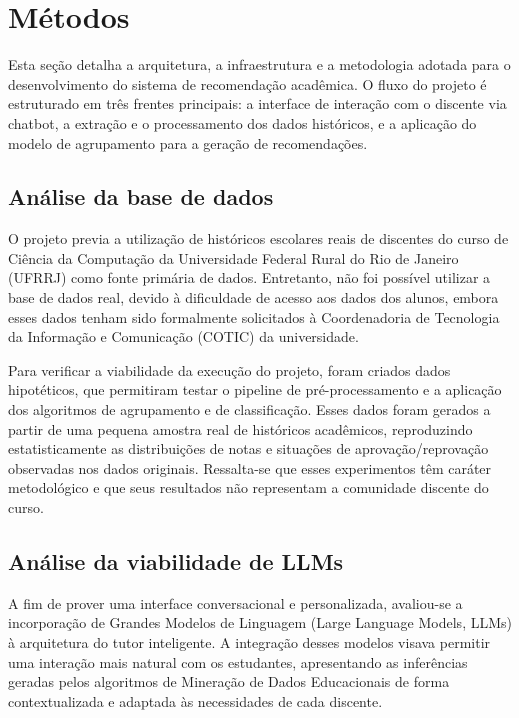 \section{Métodos}

Esta seção detalha a arquitetura, a infraestrutura e a metodologia adotada para o desenvolvimento do sistema de recomendação acadêmica. O fluxo do projeto é estruturado em três frentes principais: a interface de interação com o discente via chatbot, a extração e o processamento dos dados históricos, e a aplicação do modelo de agrupamento para a geração de recomendações.

\subsection{Análise da base de dados}

O projeto previa a utilização de históricos escolares reais de discentes do curso de Ciência da Computação da Universidade Federal Rural do Rio de Janeiro (UFRRJ) como fonte primária de dados. Entretanto, não foi possível utilizar a base de dados real, devido à dificuldade de acesso aos dados dos alunos, embora esses dados tenham sido formalmente solicitados à Coordenadoria de Tecnologia da Informação e Comunicação (COTIC) da universidade.

Para verificar a viabilidade da execução do projeto, foram criados dados hipotéticos, que permitiram testar o pipeline de pré-processamento e a aplicação dos algoritmos de agrupamento e de classificação. Esses dados foram gerados a partir de uma pequena amostra real de hist\'oricos acad\^emicos, reproduzindo estatisticamente as distribui\c{c}\~oes de notas e situa\c{c}\~oes de aprova\c{c}\~ao/reprova\c{c}\~ao observadas nos dados originais. Ressalta-se que esses experimentos t\^em car\'ater metodol\'ogico e que seus resultados n\~ao representam a comunidade discente do curso.

\subsection{Análise da viabilidade de LLMs}

A fim de prover uma interface conversacional e personalizada, avaliou-se a incorporação de Grandes Modelos de Linguagem (Large Language Models, LLMs) à arquitetura do tutor inteligente. A integração desses modelos visava permitir uma interação mais natural com os estudantes, apresentando as inferências geradas pelos algoritmos de Mineração de Dados Educacionais de forma contextualizada e adaptada às necessidades de cada discente.

